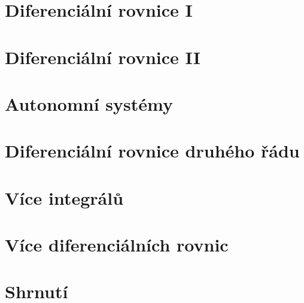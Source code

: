 \konec


\section{Diferenciální rovnice I}

\section{Diferenciální rovnice II}

\section{Autonomní systémy}

\section{Diferenciální rovnice druhého řádu}

\section{Více integrálů}

\section{Více diferenciálních rovnic}

\section{Shrnutí}






